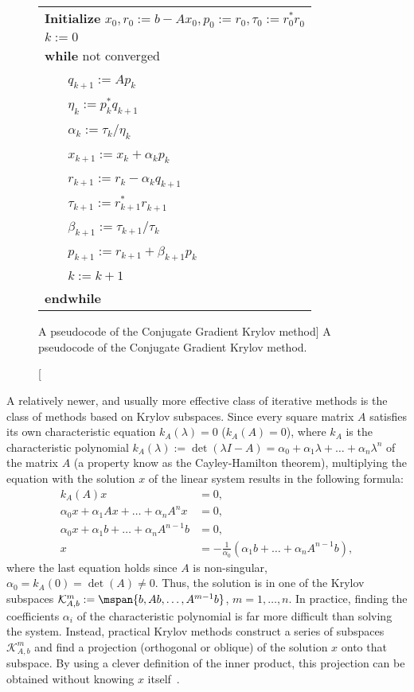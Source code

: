\begin{figure}[t]
\begin{center}
\begin{tabular}{l}
\hline
\textbf{Initialize} $x_0, r_0 := b-Ax_0, p_0 := r_0, \tau_0 := r_{0}^* r_{0}^{}$
\\ $k := 0$                                                
\\ {\bf while} not converged
\\ ~~~ $q_{k+1}:=Ap_{k}$                        
\\ ~~~ $\eta_k:=p_{k}^*q_{k+1}^{}$    
\\ ~~~ $\alpha_k:=\tau_k/\eta_k$    
\\ ~~~ $x_{k+1}:=x_k+\alpha_k p_{k}$           
\\ ~~~ $r_{k+1}:=r_k-\alpha_k q_{k+1}$            
\\ ~~~ $\tau_{k+1}:= r_{k+1}^* r_{k+1}^{}$  
\\ ~~~ $\beta_{k+1}:=\tau_{k+1}/\tau_{k}$  
\\ ~~~ $p_{k+1}:= r_{k+1} + \beta_{k+1} p_k$ 

\\ ~~~ $k:=k+1$   
\\ {\bf endwhile}  
\\\hline
\end{tabular}
\end{center}
\caption
[A pseudocode of the Conjugate Gradient Krylov method]
{A pseudocode of the Conjugate Gradient Krylov method.}
\label{introduction:fig:cg}
\end{figure}

A relatively newer, and usually more effective class of iterative methods is the
class of methods based on Krylov subspaces. Since every square matrix
$A$ satisfies its own characteristic equation $k_A(\lambda) = 0$ (\ie $k_A(A) =
0$), where $k_A$ is the characteristic polynomial $k_A(\lambda) := \det(\lambda
I - A) = \alpha_0 + \alpha_1 \lambda + \ldots + \alpha_n \lambda^n$ of the
matrix $A$ (a property know as the Cayley-Hamilton theorem), multiplying the
equation with the solution $x$ of the linear system results in the following
formula:
\begin{align}
    k_A(A)x &= 0,\\
    \alpha_0 x + \alpha_1 Ax + \ldots + \alpha_n A^n x &= 0,\\
    \alpha_0 x + \alpha_1 b + \ldots + \alpha_n A^{n-1} b &= 0,\\
    x &= -\frac{1}{\alpha_0}(\alpha_1 b + \ldots + \alpha_n A^{n-1}b),
\end{align}
where the last equation holds since $A$ is non-singular, \ie $\alpha_0 = k_A(0)
= \det(A) \neq 0$. Thus, the solution is in one of the Krylov subspaces
$\mathcal{K}_{A, b}^m := \mspan\{b, Ab, \ldots, A^{m-1}b\}$, $m = 1, \ldots, n$.
In practice, finding the coefficients $\alpha_i$ of the characteristic
polynomial is far more difficult than solving the system. Instead, practical
Krylov methods construct a series of subspaces $\mathcal{K}_{A,b}^m$ and find a
projection (orthogonal or oblique) of the solution $x$ onto that subspace. By
using a clever definition of the inner product, this projection can be
obtained without knowing $x$ itself~\cite{demmel,saad}.

